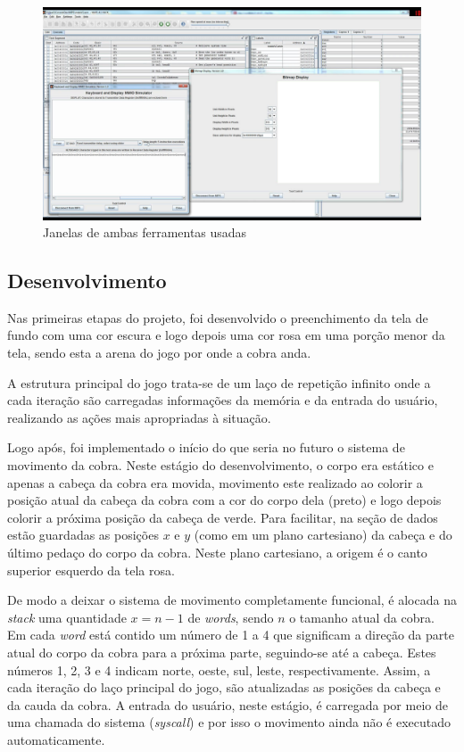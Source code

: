 \documentclass[a4paper]{sbgames}
\begin{document}
{{\begin{figure}[htb]
  \begin{center}
   \includegraphics[width=1.0\linewidth]{./Figures/marstools.png}
  \end{center}
  \caption{Janelas de ambas ferramentas usadas}
  \label{fig:08}
\end{figure}


\subsection{Desenvolvimento}
\label{sec:Desenvolvimento}

Nas primeiras etapas do projeto, foi desenvolvido o preenchimento da tela de fundo com uma cor escura e logo depois uma cor rosa em uma porção menor da tela, sendo esta a arena do jogo por onde a cobra anda. 

A estrutura principal do jogo trata-se de um laço de repetição infinito onde a cada iteração são carregadas informações da memória e da entrada do usuário, realizando as ações mais apropriadas à situação.

Logo após, foi implementado o início do que seria no futuro o sistema de movimento da cobra. Neste estágio do desenvolvimento, o corpo era estático e apenas a cabeça da cobra era movida, movimento este realizado ao colorir a posição atual da cabeça da cobra com a cor do corpo dela (preto) e logo depois colorir a próxima posição da cabeça de verde. Para facilitar, na seção de dados estão guardadas as posições $x$ e $y$ (como em um plano cartesiano) da cabeça e do último pedaço do corpo da cobra. Neste plano cartesiano, a origem é o canto superior esquerdo da tela rosa.

De modo a deixar o sistema de movimento completamente funcional, é alocada na \textit{stack} uma quantidade $x = n-1$ de \textit{words}, sendo $n$ o tamanho atual da cobra. Em cada \textit{word} está contido um número de 1 a 4 que significam a direção da parte atual do corpo da cobra para a próxima parte, seguindo-se até a cabeça. Estes números 1, 2, 3 e 4 indicam norte, oeste, sul, leste, respectivamente. Assim, a cada iteração do laço principal do jogo, são atualizadas as posições da cabeça e da cauda da cobra. A entrada do usuário, neste estágio, é carregada por meio de uma chamada do sistema (\textit{syscall}) e por isso o movimento ainda não é executado automaticamente.

}}
\end{document}
